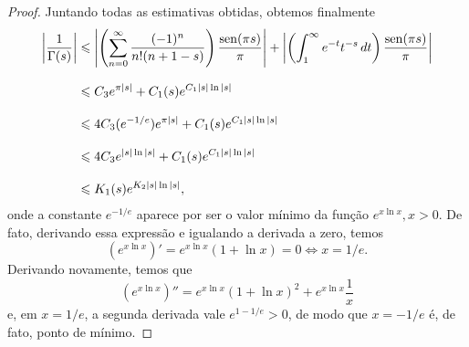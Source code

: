 \begin{proof}
        Juntando todas as estimativas obtidas, obtemos finalmente
        \begin{align*}
            \left| \frac{1}{\Gamma(s)} \right| 
            &\leqslant \left|\left(\sum_{n=0}^{\infty} \frac{(-1)^n}{n!(n+1-s)}\right)\frac{\operatorname{sen}(\pi s)}{\pi}\right|
            + \left| \left( \int_1^{\infty} e^{-t} t^{-s} \, dt \right)\frac{\operatorname{sen}(\pi s)}{\pi} \right| \\[0.3cm]
            &\leqslant C_3e^{\pi |s|} + C_1(s)e^{C_1|s|\ln|s|} \\[0.3cm]
            &\leqslant 4C_3(e^{-1/e})e^{\pi |s|} + C_1(s)e^{C_1|s|\ln|s|} \\[0.3cm]
            &\leqslant 4C_3e^{|s|\ln|s|} + C_1(s)e^{C_1|s|\ln|s|} \\[0.3cm]
            &\leqslant K_1(s)e^{K_2|s|\ln|s|},
        \end{align*}
        onde a constante $e^{-1/e}$ aparece por ser o valor mínimo da função $e^{x\ln x}, x>0$. De fato,
        derivando essa expressão e igualando a derivada a zero, temos
        \[
        (e^{x\ln x})' = e^{x\ln x}(1 + \ln x) = 0 \iff x = 1/e.
        \]
        Derivando novamente, temos que
        \[
        (e^{x\ln x})'' = e^{x\ln x}(1 + \ln x)^2 + e^{x\ln x}\frac{1}{x}
        \]
        e, em $x = 1/e$, a segunda derivada vale $e^{1 - 1/e} > 0$, de modo que $x = -1/e$
        é, de fato, ponto de mínimo.
    \end{proof}
    
    \medskip
    
